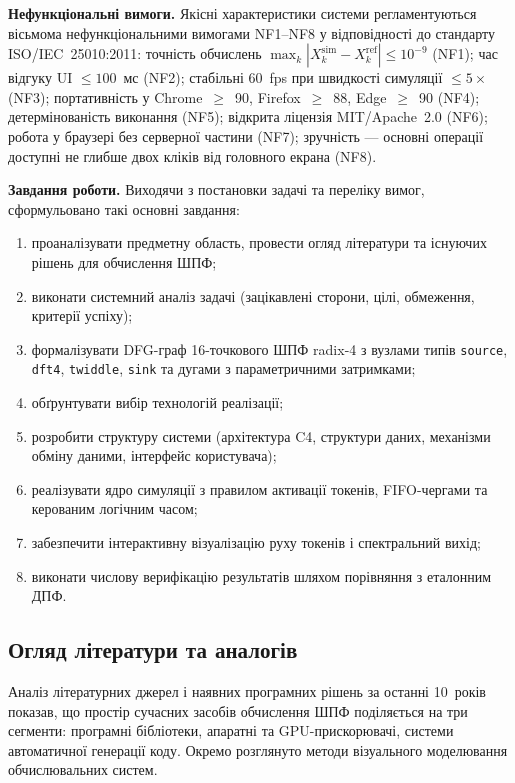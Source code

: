 \documentclass[14pt,a4paper]{extarticle}
\begin{document}
\textbf{Нефункціональні вимоги.}
Якісні характеристики системи регламентуються вісьмома
нефункціональними вимогами NF1--NF8 у відповідності до стандарту
ISO/IEC~25010:2011: точність обчислень
$\max_k |X_k^{\mathrm{sim}} - X_k^{\mathrm{ref}}| \le 10^{-9}$ (NF1);
час відгуку UI $\le 100$~мс (NF2); стабільні 60~fps при швидкості
симуляції $\le 5\times$ (NF3); портативність у Chrome~$\ge$~90,
Firefox~$\ge$~88, Edge~$\ge$~90 (NF4); детермінованість виконання
(NF5); відкрита ліцензія MIT/Apache~2.0 (NF6); робота у браузері без
серверної частини (NF7); зручність --- основні операції доступні не
глибше двох кліків від головного екрана (NF8).

\textbf{Завдання роботи.}
Виходячи з постановки задачі та переліку вимог, сформульовано такі
основні завдання:
\begin{enumerate}
  \item проаналізувати предметну область, провести огляд літератури
        та існуючих рішень для обчислення ШПФ;
  \item виконати системний аналіз задачі (зацікавлені сторони, цілі,
        обмеження, критерії успіху);
  \item формалізувати DFG-граф 16-точкового ШПФ radix-4 з вузлами
        типів \texttt{source}, \texttt{dft4}, \texttt{twiddle},
        \texttt{sink} та дугами з параметричними затримками;
  \item обґрунтувати вибір технологій реалізації;
  \item розробити структуру системи (архітектура C4, структури даних,
        механізми обміну даними, інтерфейс користувача);
  \item реалізувати ядро симуляції з правилом активації токенів,
        FIFO-чергами та керованим логічним часом;
  \item забезпечити інтерактивну візуалізацію руху токенів і
        спектральний вихід;
  \item виконати числову верифікацію результатів шляхом порівняння
        з еталонним ДПФ.
\end{enumerate}

\subsection{Огляд літератури та аналогів}

Аналіз літературних джерел і наявних програмних рішень за останні
10~років показав, що простір сучасних засобів обчислення ШПФ
поділяється на три сегменти: програмні бібліотеки, апаратні та
GPU-прискорювачі, системи автоматичної генерації коду. Окремо
розглянуто методи візуального моделювання обчислювальних систем.
\end{document}
